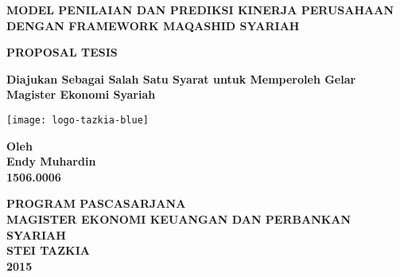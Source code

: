 
\thispagestyle{plain}
\begin{titlepage}
\begin{center}
\vspace{4cm}

{\Large
  \textbf{
    \uppercase{Model Penilaian dan Prediksi Kinerja Perusahaan dengan Framework Maqashid Syariah}
  }
}

\vspace{1cm}

{\Large\textbf{\uppercase{Proposal Tesis}}}

\vspace{1cm}

\textbf{Diajukan Sebagai Salah Satu Syarat untuk Memperoleh Gelar\\
Magister Ekonomi Syariah}
    
\vspace{1cm}
    
\texttt{[image: logo-tazkia-blue]}

\vspace{1cm}

\Large

\textbf{
Oleh\\
Endy Muhardin\\
1506.0006
}

\vfill
\textbf{
  \uppercase{
    Program Pascasarjana\\
    Magister Ekonomi Keuangan dan Perbankan Syariah\\
    STEI Tazkia\\
    2015
  }
}
\end{center}
\end{titlepage}
